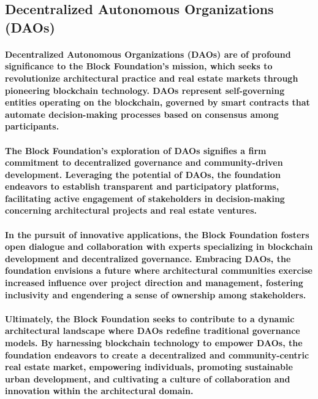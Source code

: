 \subsection{Decentralized Autonomous Organizations (DAOs)}

\paragraph{
Decentralized Autonomous Organizations (DAOs) are of profound significance to the Block Foundation's mission, which seeks to revolutionize architectural practice and real estate markets through pioneering blockchain technology. DAOs represent self-governing entities operating on the blockchain, governed by smart contracts that automate decision-making processes based on consensus among participants.
}

\paragraph{
The Block Foundation's exploration of DAOs signifies a firm commitment to decentralized governance and community-driven development. Leveraging the potential of DAOs, the foundation endeavors to establish transparent and participatory platforms, facilitating active engagement of stakeholders in decision-making concerning architectural projects and real estate ventures.
}

\paragraph{
In the pursuit of innovative applications, the Block Foundation fosters open dialogue and collaboration with experts specializing in blockchain development and decentralized governance. Embracing DAOs, the foundation envisions a future where architectural communities exercise increased influence over project direction and management, fostering inclusivity and engendering a sense of ownership among stakeholders.
}

\paragraph{
Ultimately, the Block Foundation seeks to contribute to a dynamic architectural landscape where DAOs redefine traditional governance models. By harnessing blockchain technology to empower DAOs, the foundation endeavors to create a decentralized and community-centric real estate market, empowering individuals, promoting sustainable urban development, and cultivating a culture of collaboration and innovation within the architectural domain.
}
